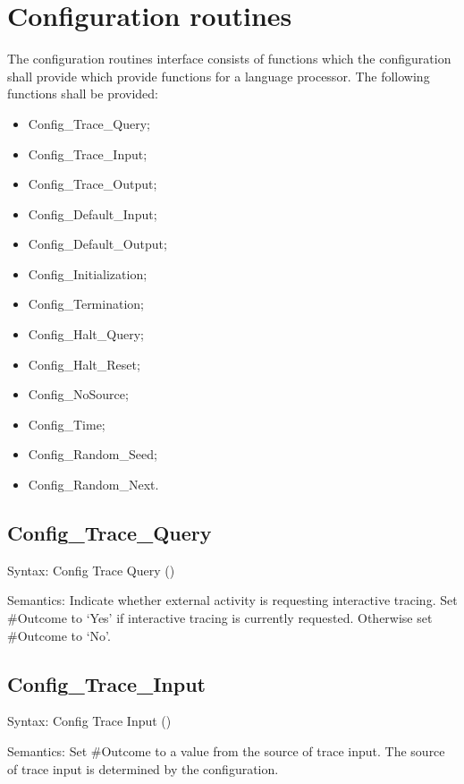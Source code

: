 \section{Configuration routines}\label{configuration-routines}

The configuration routines interface consists of functions which the
configuration shall provide which provide functions for a language
processor. The following functions shall be provided:

\begin{itemize}
\item
  Config\_Trace\_Query;
\item
  Config\_Trace\_Input;
\item
  Config\_Trace\_Output;
\item
  Config\_Default\_Input;
\item
  Config\_Default\_Output;
\item
  Config\_Initialization;
\item
  Config\_Termination;
\item
  Config\_Halt\_Query;
\item
  Config\_Halt\_Reset;
\item
  Config\_NoSource;
\item
  Config\_Time;
\item
  Config\_Random\_Seed;
\item
  Config\_Random\_Next.
\end{itemize}

\subsection{Config\_Trace\_Query}\label{config_trace_query}

Syntax: Config Trace Query ()

Semantics: Indicate whether external activity is requesting interactive
tracing. Set \#Outcome to `Yes' if interactive tracing is currently
requested. Otherwise set \#Outcome to `No'.

\subsection{Config\_Trace\_Input}\label{config_trace_input}

Syntax: Config Trace Input ()

Semantics: Set \#Outcome to a value from the source of trace input. The
source of trace input is determined by the configuration.

